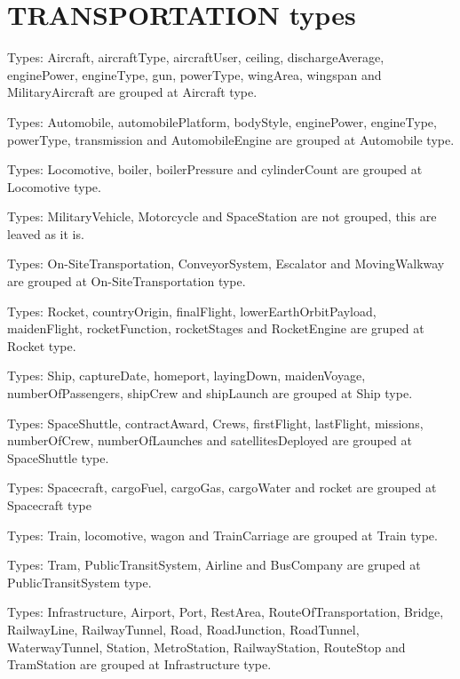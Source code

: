 \documentclass[thesis=M,english]{FITthesis}[2018/05/30]
\begin{document}
\section{TRANSPORTATION types}\label{TransportationTypes}
Types: Aircraft, aircraftType, aircraftUser, ceiling, dischargeAverage, enginePower, engineType, gun, powerType, wingArea, wingspan and MilitaryAircraft are grouped at Aircraft type.

Types: Automobile, automobilePlatform, bodyStyle, enginePower, engineType, powerType, transmission and AutomobileEngine are grouped at Automobile type.

Types: Locomotive, boiler, boilerPressure and cylinderCount are grouped at Locomotive type.

Types: MilitaryVehicle, Motorcycle and SpaceStation are not grouped, this are leaved as it is. 

Types: On-SiteTransportation, ConveyorSystem, Escalator and MovingWalkway are grouped at On-SiteTransportation type.

Types: Rocket, countryOrigin, finalFlight, lowerEarthOrbitPayload, maidenFlight, rocketFunction, rocketStages and RocketEngine are gruped at Rocket type.

Types: Ship, captureDate, homeport, layingDown, maidenVoyage, numberOfPassengers, shipCrew and shipLaunch are grouped at Ship type.

Types: SpaceShuttle, contractAward, Crews, firstFlight, lastFlight, missions, numberOfCrew, numberOfLaunches and satellitesDeployed  are grouped at SpaceShuttle type.
 


Types: Spacecraft, cargoFuel, cargoGas, cargoWater and rocket are grouped at Spacecraft type 

Types: Train, locomotive, wagon and TrainCarriage are grouped at Train type.

Types: Tram, PublicTransitSystem, Airline and BusCompany are gruped at PublicTransitSystem type.

Types: Infrastructure, Airport, Port, RestArea, RouteOfTransportation, Bridge, RailwayLine, RailwayTunnel, Road, RoadJunction, RoadTunnel, WaterwayTunnel, Station, MetroStation, RailwayStation, RouteStop and TramStation are grouped at Infrastructure type.
\end{document}
